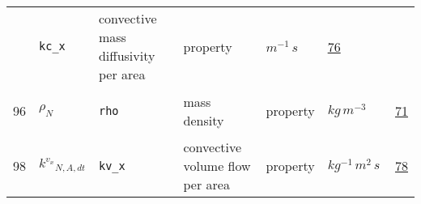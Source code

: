 \begin{longtable}{|p{1cm}|p{3cm}|p{5cm}|p{7.5cm}|p{3.0cm}|p{3cm}|p{1cm}|}
             & \verb|kc_x|
             & convective mass diffusivity per area
             & \begin{lay}property \end{lay}
             & $ m^{-1} \,s \, $
             & \hyperlink{"e:76"}{ 76 }
                 \\
    96
             & \hypertarget{"v:96"}{ $ {\rho}_{N} $}
             & \verb|rho|
             & mass density
             & \begin{lay}property \end{lay}
             & $ kg \,m^{-3} \, $
             & \hyperlink{"e:71"}{ 71 }
                 \\
    98
             & \hypertarget{"v:98"}{ $ {k^{v_x}}_{N, A, dt} $}
             & \verb|kv_x|
             & convective volume flow per area
             & \begin{lay}property \end{lay}
             & $ kg^{-1} \,m^{2} \,s \, $
             & \hyperlink{"e:78"}{ 78 }
                 \\
    \end{longtable}